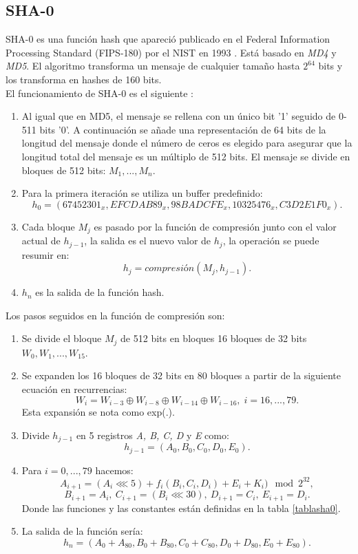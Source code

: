 \subsection{SHA-0}
SHA-0 es una función hash que apareció publicado en el Federal Information Processing Standard (FIPS-180) por el NIST en 1993 \cite{Penard2008}. Está basado en \emph{MD4} y \emph{MD5}. El algoritmo transforma un mensaje de cualquier tamaño hasta $2^{64}$ bits y los transforma en hashes de 160 bits.\\
El funcionamiento de SHA-0 es el siguiente \cite{sha0}:
\begin{enumerate}
	\item Al igual que en MD5, el mensaje se rellena con un único bit '1' seguido de 0-511 bits '0'. A continuación se añade una representación de 64 bits de la longitud del mensaje donde el número de ceros es elegido para asegurar que la longitud total del mensaje es un múltiplo de 512 bits. El mensaje se divide en bloques de 512 bits: $M_1,...,M_n$.
	\item Para la primera iteración se utiliza un buffer predefinido:
	$$
		h_0=(67452301_x, EFCDAB89_x, 98BADCFE_x, 10325476_x, C3D2E1F0_x).
	$$
	\item Cada bloque $M_j$ es pasado por la función de compresión junto con el valor actual de $h_{j-1}$, la salida es el nuevo valor de $h_j$, la operación se puede resumir en:
	$$
		h_j=compresión(M_j,h_{j-1}).
	$$
	\item $h_n$ es la salida de la función hash.
\end{enumerate}
Los pasos seguidos en la función de compresión son:
\begin{enumerate}
	\item Se divide el bloque $M_j$ de 512 bits en bloques 16 bloques de 32 bits $W_0,W_1,...,W_{15}$. 
	\item Se expanden los 16 bloques de 32 bits en 80 bloques a partir de la siguiente ecuación en recurrencias:
	$$
		W_i=W_{i-3}\oplus W_{i-8}\oplus W_{i-14}\oplus W_{i-16},\; i=16,...,79.
	$$
	Esta expansión se nota como exp(.).
	\item Divide $h_{j-1}$ en 5 registros \emph{A, B, C, D} y \emph{E} como:
	$$
		h_{j-1} = (A_0, B_0, C_0, D_0, E_0).
	$$
	\item Para $i=0,...,79$ hacemos:
	$$
		A_{i+1}=(A_i\lll5)+f_i(B_i,C_i,D_i)+E_i+K_i) \mod 2^{32},
	$$
	$$
		B_{i+1}=A_i,\: C_{i+1}=(B_i\lll30),\: D_{i+1}=C_i,\: E_{i+1}=D_i.
	$$
	Donde las funciones y las constantes están definidas en la tabla \ref{tablasha0}.
	\item La salida de la función sería:
	$$
		h_n=(A_0+A_{80}, B_0+B_{80}, C_0+C_{80}, D_0+D_{80}, E_0+E_{80}).
	$$
\end{enumerate}

